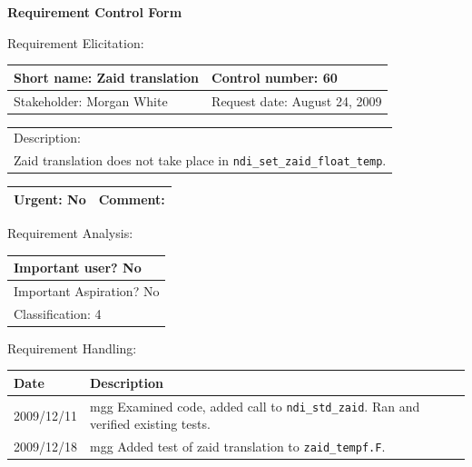 \begin{center}\Large\bf
Requirement Control Form
\end{center}
\vspace{24pt}

Requirement Elicitation:

\begin{tabular}{|p{211pt}|p{211pt}|} \hline
Short name: Zaid translation & Control number: 60\\ \hline
Stakeholder: Morgan White & Request date: August 24, 2009\\
\end{tabular}
\begin{tabular}{|p{433pt}|} \hline
Description: \\ 
Zaid translation does not take place in \texttt{ndi\_set\_zaid\_float\_temp}.
\\ \hline
\end{tabular} 
\begin{tabular}{|p{211pt}|p{211pt}|} \hline
Urgent: No & Comment: 
\\ \hline
\end{tabular}

\vspace{24pt}

Requirement Analysis:

\begin{tabular}{|p{433pt}|} \hline
Important user? No \\ \hline
Important Aspiration? No \\ \hline
Classification: 4 \\ \hline
\end{tabular}
\vspace{24pt}

Requirement Handling:

\begin{tabular}{|p{72pt}|p{351pt}|} \hline
Date & Description \\ \hline
2009/12/11 & mgg Examined code, added call to \texttt{ndi\_std\_zaid}.
  Ran and verified existing tests. \\ \hline
2009/12/18 & mgg Added test of zaid translation to
\texttt{zaid\_tempf.F}. \\ \hline 
\end{tabular}
